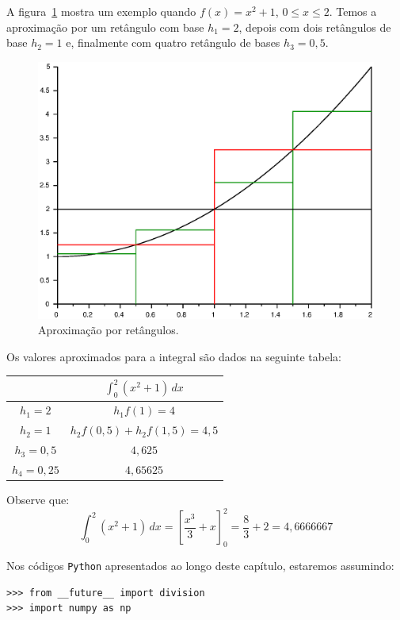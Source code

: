 \begin{ex}
A figura~\ref{fig:int_101} mostra um exemplo quando $f(x)=x^2+1$, $0\leq x\leq 2$. Temos a aproximação por um retângulo com base $h_1=2$, depois com dois retângulos de base $h_2=1$ e, finalmente com quatro retângulo de bases $h_3=0,5$.
\begin{figure}
  \centering
  \includegraphics[scale=0.7]{./cap_integracao/pics/int_1/int_1.eps}
  \caption{Aproximação por retângulos.}
  \label{fig:int_101}
\end{figure}

Os valores aproximados para a integral são dados na seguinte tabela:

\begin{tabular}{|c|c|}\hline
  & $\displaystyle \int_0^2(x^2+1)\,dx$ \\ \hline
  $h_1=2$ & $h_1f(1)=4$ \\
  $h_2=1$ & $h_2f(0,5)+h_2f(1,5)=4,5$ \\
  $h_3=0,5$ & $4,625$ \\
  $h_4=0,25$ & $4,65625$ \\\hline
\end{tabular}

Observe que:
\begin{equation*}
  \int_0^2(x^2+1)\,dx = \left[\frac{x^3}{3}+x\right]_0^2 = \frac{8}{3}+2=4,6666667
\end{equation*}
\end{ex}

\ifispython
Nos códigos \verb+Python+ apresentados ao longo deste capítulo, estaremos assumindo:
\begin{verbatim}
>>> from __future__ import division
>>> import numpy as np
\end{verbatim}
\fi



